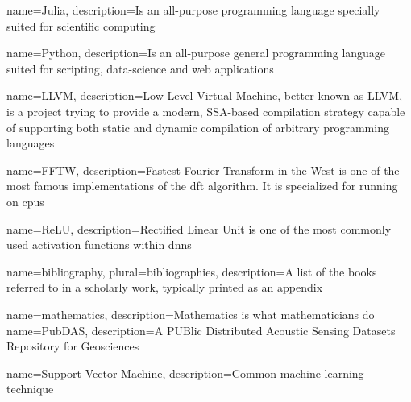 

\makeglossaries %

{
        name=Julia,
        description={Is an all-purpose programming language specially suited for
scientific computing}
}

{
        name=Python,
        description={Is an all-purpose general programming language suited for scripting, data-science and web applications}
}

{
        name=LLVM,
        description={Low Level Virtual Machine, better known as LLVM, is a project trying to provide a modern, SSA-based compilation strategy capable of supporting both static and dynamic compilation of arbitrary programming languages \cite{llvm}}
}

{
        name=FFTW,
        description={Fastest Fourier Transform in the West is one of the most famous implementations of the \acrshort{dft} algorithm. It is specialized for running on \acrlong{cpu}s}
}

{
    name=ReLU,
    description={Rectified Linear Unit is one of the most commonly used activation functions within \acrshort{dnn}s}
}

{
        name=bibliography,
        plural=bibliographies,
        description={A list of the books referred to in a scholarly work,
typically printed as an appendix}
}

{
    name=mathematics,
    description={Mathematics is what mathematicians do}
}
{
    name=PubDAS,
    description={A PUBlic Distributed Acoustic Sensing Datasets Repository for Geosciences}
}


{
    name=Support Vector Machine,
    description={Common machine learning technique}
}





